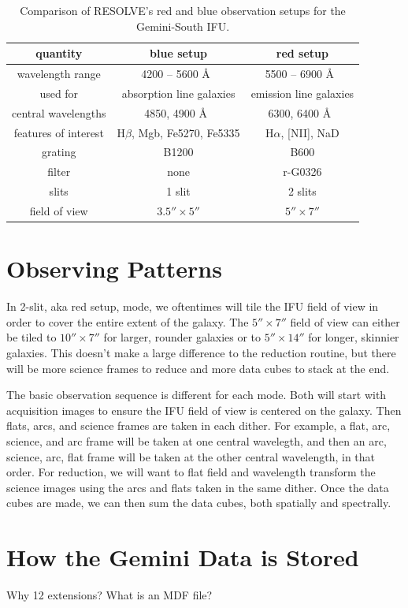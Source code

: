 \documentclass[12pt]{report}
\begin{document}
\begin{table}
\centering
\begin{tabular}[t]{ccc}
  \hline
quantity  & blue setup & red setup \\ \hline
wavelength range & 4200 -- 5600 \AA\ &  5500 -- 6900 \AA\ \\ 
used for & absorption line galaxies & emission line galaxies \\
central wavelengths & 4850, 4900 \AA\ & 6300, 6400 \AA\ \\
features of interest & H$\beta$, Mgb, Fe5270, Fe5335 & H$\alpha$, [NII], NaD \\ 
grating & B1200 & B600 \\ 
filter & none & r-G0326 \\
slits & 1 slit & 2 slits \\ 
field of view & $3.5''\times5''$ & $5''\times7''$ \\ \hline
\end{tabular}
\caption[RESOLVE's Observation Setups]{Comparison of RESOLVE's red and blue observation setups for the Gemini-South IFU.}
\label{table:1}
\end{table}

\section{Observing Patterns}
In 2-slit, aka red setup, mode, we oftentimes will tile the IFU field of view in order to cover the entire extent of the galaxy. The $5''\times7''$ field of view can either be tiled to $10''\times7''$ for larger, rounder galaxies or to  $5''\times14''$ for longer, skinnier galaxies. This doesn't make a large difference to the reduction routine, but there will be more science frames to reduce and more data cubes to stack at the end.

The basic observation sequence is different for each mode. Both will start with acquisition images to ensure the IFU field of view is centered on the galaxy. Then flats, arcs, and science frames are taken in each dither. For example, a flat, arc, science, and arc frame will be taken at one central wavelegth, and then an arc, science, arc, flat frame will be taken at the other central wavelength, in that order. For reduction, we will want to flat field and wavelength transform the science images using the arcs and flats taken in the same dither. Once the data cubes are made, we can then sum the data cubes, both spatially and spectrally.

\section{How the Gemini Data is Stored}
Why 12 extensions?
What is an MDF file?
\end{document}

